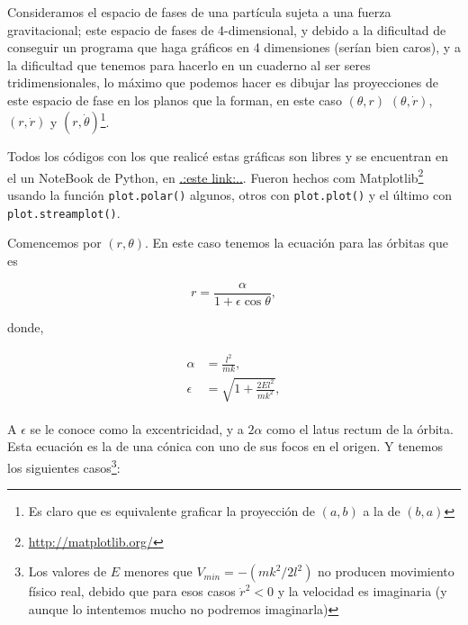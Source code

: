 \documentclass[a4paper,10pt]{article}
\numberwithin{equation}{section}
\begin{document}
Consideramos el espacio de fases de una partícula sujeta a una fuerza gravitacional;
este espacio de fases de 4-dimensional, y debido a la dificultad de conseguir un 
programa que haga gráficos en 4 dimensiones (serían bien caros), y a la dificultad 
que tenemos para hacerlo en un cuaderno al ser seres tridimensionales, lo máximo que 
podemos hacer es dibujar las proyecciones de este espacio de fase en los planos que
la forman, en este caso $(\theta,r)$ $(\theta,\dot{r})$, $(r,\dot{r})$ y $(r,\dot{\theta})$\footnote{
Es claro que es equivalente graficar la proyección de $(a,b)$ a la de $(b,a)$}.

\vspace{.3cm}

Todos los códigos con los que realicé estas gráficas son libres y se encuentran en 
el un NoteBook de Python, en \href{https://github.com/FavioVazquez/MecanicaClasica-PCF/blob/master/Tarea3/Problema5.ipynb}{\color{blue}.:este link:..}.
Fueron hechos com Matplotlib\footnote{\href{http://matplotlib.org/}{http://matplotlib.org/}} usando
la función \texttt{plot.polar()} algunos, otros con \texttt{plot.plot()} y el último 
con \texttt{plot.streamplot()}.

\vspace{.3cm}

Comencemos por $(r,\theta)$. En este caso tenemos la  ecuación para las órbitas que es

\begin{equation}
 r = \frac{\alpha}{1 + \epsilon \cos{\theta}},
 \label{eq:rtita}
\end{equation}

donde,

\begin{align}
 \begin{split}
  \alpha &= \frac{l^2}{m k}, \\
  \epsilon &= \sqrt{1 + \frac{2El^2}{mk^2}},
 \end{split}
\end{align}

A $\epsilon$ se le conoce como la excentricidad, y a $2\alpha$ como el latus rectum 
de la órbita. Esta ecuación  es la de una cónica con uno de sus focos 
en el origen. Y tenemos los siguientes casos\footnote{Los valores de $E$ menores que 
$V_{min}= -(mk^2/2l^2)$ no producen movimiento físico real, debido que para esos 
casos $\dot{r}^2 < 0$ y la velocidad es imaginaria (y aunque lo intentemos mucho
no podremos imaginarla)}:
\end{document}
